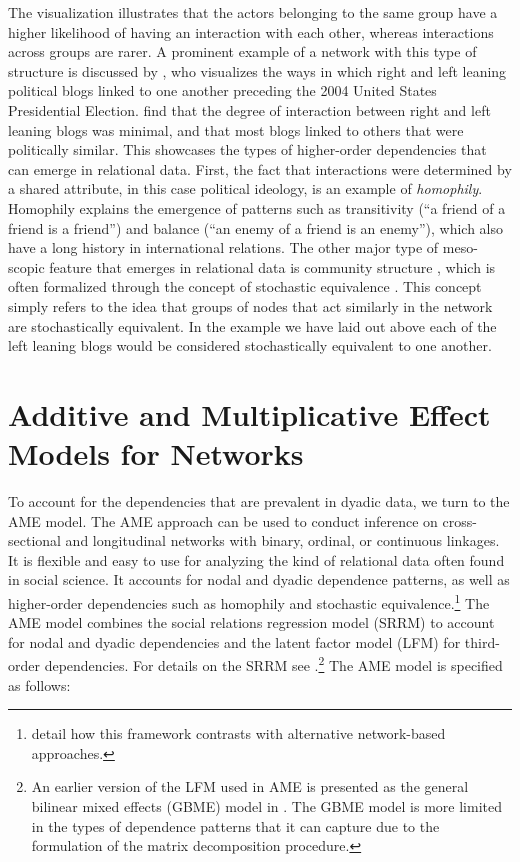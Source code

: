 The visualization illustrates that the actors belonging to the same group have a higher likelihood of having an interaction with each other, whereas interactions across groups are rarer. A prominent example of a network with this type of structure is discussed by \citet{adamic:glance:2005}, who visualizes the ways in which right and left leaning political blogs linked to one another preceding the 2004 United States Presidential Election. \citeauthor{adamic:glance:2005} find that the degree of interaction between right and left leaning blogs was minimal, and that most blogs linked to others that were politically similar. This showcases the types of higher-order dependencies that can emerge in relational data. First, the fact that interactions were determined by a shared attribute, in this case political ideology, is an example of \textit{homophily}. Homophily explains the emergence of patterns such as transitivity (``a friend of a friend is a friend'') and balance (``an enemy of a friend is an enemy''), which also have a long history in international relations. The other major type of meso-scopic feature that emerges in relational data is community structure \citep{mucha:etal:2010}, which is often formalized through the concept of stochastic equivalence \citep{anderson:etal:1992}. This concept simply refers to the idea that groups of nodes that act similarly in the network are stochastically equivalent. In the example we have laid out above each of the left leaning blogs would be considered stochastically equivalent to one another. 

\section{\textbf{Additive and Multiplicative Effect Models for Networks}}

To account for the dependencies that are prevalent in dyadic data, we turn to the AME model. The AME approach can be used to conduct inference on cross-sectional and longitudinal networks with binary, ordinal, or continuous linkages. It is flexible and easy to use for analyzing the kind of relational data often found in social science. It accounts for nodal and dyadic dependence patterns, as well as higher-order dependencies such as homophily and stochastic equivalence.\footnote{\citet{minhas:etal:2016:arxiv} detail how this framework contrasts with alternative network-based approaches.} The AME model combines the social relations regression model (SRRM) to account for nodal and dyadic dependencies and the latent factor model (LFM) for third-order dependencies.  For details on the SRRM see \citet{li:loken:2002,hoff:2005,dorff:minhas:2017}.\footnote{An earlier version of the LFM  used in AME is presented as the general bilinear mixed effects (GBME) model in \citet{hoff:ward:2004}. The GBME model is more limited in the types of dependence patterns that it can capture due to the formulation of the matrix decomposition procedure.} The AME model is specified as follows:

